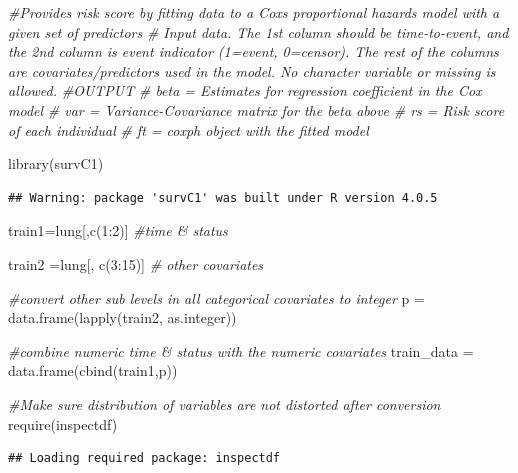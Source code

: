 \documentclass[
  11pt,
]{article}
\newenvironment{Shaded}{\begin{snugshade}}{\end{snugshade}}
\newcommand{\CommentTok}[1]{\textcolor[rgb]{0.56,0.35,0.01}{\textit{#1}}}
\newcommand{\DecValTok}[1]{\textcolor[rgb]{0.00,0.00,0.81}{#1}}
\newcommand{\FunctionTok}[1]{\textcolor[rgb]{0.00,0.00,0.00}{#1}}
\newcommand{\NormalTok}[1]{#1}
\newcommand{\OtherTok}[1]{\textcolor[rgb]{0.56,0.35,0.01}{#1}}
\newcommand{\SpecialCharTok}[1]{\textcolor[rgb]{0.00,0.00,0.00}{#1}}
\begin{document}
\begin{Shaded}
\begin{Highlighting}[]
\CommentTok{\#Provides risk score by fitting data to a Cox\textquotesingle{}s proportional hazards model with a given set of predictors}
\CommentTok{\# Input data. The 1st column should be time{-}to{-}event, and the 2nd column is event indicator (1=event, 0=censor). The rest of the columns are covariates/predictors used in the model. No character variable or missing is allowed. }
\CommentTok{\#OUTPUT}
\CommentTok{\# beta = Estimates for regression coefficient in the Cox model}
\CommentTok{\# var = Variance{-}Covariance matrix for the beta above}
\CommentTok{\# rs    = Risk score of each individual}
\CommentTok{\# ft    = coxph object with the fitted model}

\FunctionTok{library}\NormalTok{(survC1)}
\end{Highlighting}
\end{Shaded}

\begin{verbatim}
## Warning: package 'survC1' was built under R version 4.0.5
\end{verbatim}

\begin{Shaded}
\begin{Highlighting}[]
\NormalTok{train1}\OtherTok{=}\NormalTok{lung[,}\FunctionTok{c}\NormalTok{(}\DecValTok{1}\SpecialCharTok{:}\DecValTok{2}\NormalTok{)] }\CommentTok{\#time \& status}

\NormalTok{train2 }\OtherTok{=}\NormalTok{lung[, }\FunctionTok{c}\NormalTok{(}\DecValTok{3}\SpecialCharTok{:}\DecValTok{15}\NormalTok{)] }\CommentTok{\# other covariates}

\CommentTok{\#convert other sub levels in all categorical covariates to integer}
\NormalTok{p }\OtherTok{=} \FunctionTok{data.frame}\NormalTok{(}\FunctionTok{lapply}\NormalTok{(train2, as.integer))}

\CommentTok{\#combine numeric time \& status with the numeric covariates}
\NormalTok{train\_data }\OtherTok{=} \FunctionTok{data.frame}\NormalTok{(}\FunctionTok{cbind}\NormalTok{(train1,p)) }

\CommentTok{\#Make sure distribution of variables are not distorted after conversion}
\FunctionTok{require}\NormalTok{(inspectdf)}
\end{Highlighting}
\end{Shaded}

\begin{verbatim}
## Loading required package: inspectdf
\end{verbatim}
\end{document}
